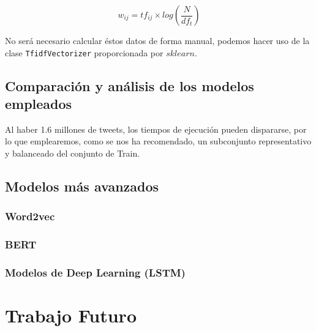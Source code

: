 \documentclass[a4paper,12pt]{report}
\begin{document}
\[ w_{ij} = tf_{ij} \times log \left( \frac{N}{df_t} \right) \] 

\vspace{2mm}
{\setlength{\parindent}{0cm}
No será necesario calcular éstos datos de forma manual, podemos hacer uso de la clase
\texttt{TfidfVectorizer} proporcionada por $sklearn$. }
\vspace{4mm}

\section{Comparación y análisis de los modelos empleados}

{\setlength{\parindent}{0cm}
Al haber 1.6 millones de tweets, los tiempos de ejecución pueden dispararse, por lo
que emplearemos, como se nos ha recomendado, un subconjunto representativo y
balanceado del conjunto de Train.}



\section{Modelos más avanzados}

\subsection{Word2vec}
\subsection{BERT}
\subsection{Modelos de Deep Learning (LSTM)}




\chapter{Trabajo Futuro}
\end{document}
